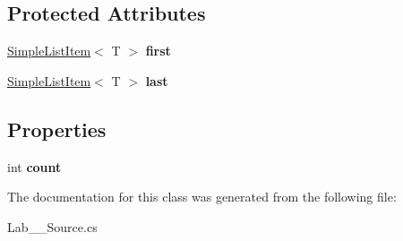 \subsection*{Protected Attributes}
\begin{DoxyCompactItemize}
\item 
\mbox{\label{class_lab__3_1_1_simple_list_a8c098afd105a16fcd767afbc089718ef}} 
\hyperlink{class_lab__3_1_1_simple_list_item}{Simple\+List\+Item}$<$ T $>$ {\bfseries first}
\item 
\mbox{\label{class_lab__3_1_1_simple_list_abd536e79607687158336cd9a29be41dd}} 
\hyperlink{class_lab__3_1_1_simple_list_item}{Simple\+List\+Item}$<$ T $>$ {\bfseries last}
\end{DoxyCompactItemize}
\subsection*{Properties}
\begin{DoxyCompactItemize}
\item 
\mbox{\label{class_lab__3_1_1_simple_list_a988b7dc1b39feced3a83dcc77fba7da9}} 
int {\bfseries count}
\end{DoxyCompactItemize}


The documentation for this class was generated from the following file\+:\begin{DoxyCompactItemize}
\item 
Lab\+\_\+\_\+\+Source.\+cs\end{DoxyCompactItemize}
